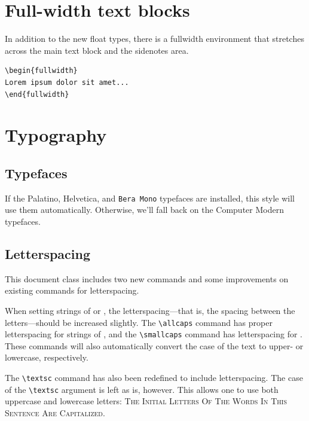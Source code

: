 \documentclass{tufte-handout}
\newcommand{\docenv}[1]{\textsf{#1}}%
\begin{document}
\section{Full-width text blocks}

In addition to the new float types, there is a \docenv{fullwidth}
environment that stretches across the main text block and the sidenotes
area.

\begin{Verbatim}
\begin{fullwidth}
Lorem ipsum dolor sit amet...
\end{fullwidth}
\end{Verbatim}

\begin{fullwidth}
\small\itshape\lipsum[1]
\end{fullwidth}

\section{Typography}\label{sec:typography}

\subsection{Typefaces}\label{sec:typefaces}
If the Palatino, \textsf{Helvetica}, and \texttt{Bera Mono} typefaces are installed, this style
will use them automatically.  Otherwise, we'll fall back on the Computer Modern
typefaces.

\subsection{Letterspacing}\label{sec:letterspacing}
This document class includes two new commands and some improvements on
existing commands for letterspacing.

When setting strings of  or , the
letter\-spacing---that is, the spacing between the letters---should be
increased slightly.\cite{Bringhurst2005}  The \Verb|\allcaps| command has proper letterspacing for
strings of , and the \Verb|\smallcaps| command
has letterspacing for .  These commands
will also automatically convert the case of the text to upper- or
lowercase, respectively.

The \Verb|\textsc| command has also been redefined to include
letterspacing.  The case of the \Verb|\textsc| argument is left as is,
however.  This allows one to use both uppercase and lowercase letters:
\textsc{The Initial Letters Of The Words In This Sentence Are Capitalized.}
\end{document}
